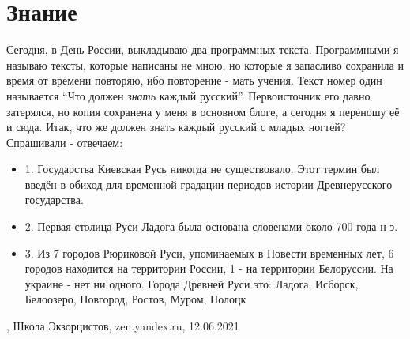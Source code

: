  
 
 
 
 
\chapter{Знание}

Сегодня, в День России, выкладываю два программных текста. Программными я
называю тексты, которые написаны не мною, но которые я запасливо сохранила и
время от времени повторяю, ибо повторение - мать учения. Текст номер один
называется \enquote{Что должен \emph{знать} каждый русский}. Первоисточник его давно
затерялся, но копия сохранена у меня в основном блоге, а сегодня я переношу её
и сюда. Итак, что же должен знать каждый русский с младых ногтей? Спрашивали -
отвечаем:
\begin{itemize}
  \item 1. Государства Киевская Русь никогда не существовало. Этот термин был введён в обиход для временной градации периодов истории Древнерусского государства.
  \item 2. Первая столица Руси Ладога была основана словенами около 700 года н э.
	\item 3. Из 7 городов Рюриковой Руси, упоминаемых в Повести временных лет, 6
					городов находится на территории России, 1 - на территории Белоруссии.
								На украине - нет ни одного. Города Древней Руси это: Ладога,
								Исборск, Белоозеро, Новгород, Ростов, Муром, Полоцк
\end{itemize}
, 
Школа Экзорцистов, zen.yandex.ru, 12.06.2021

